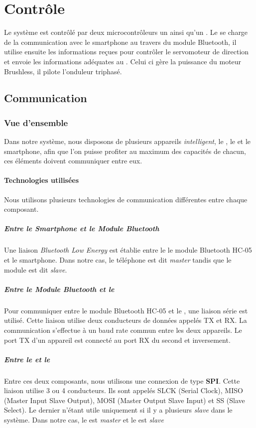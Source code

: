 	\chapter{Contrôle}
	Le système est contrôlé par deux microcontrôleurs un \pic ainsi qu'un \dspic. Le \pic se charge de la communication avec le smartphone au travers du module Bluetooth, il utilise ensuite les informations reçues pour contrôler le servomoteur de direction et envoie les informations adéquates au \dspic. Celui ci gère la puissance du moteur Brushless, il pilote l'onduleur triphasé.%
		\section{Communication}
			\subsection{Vue d'ensemble}
				Dans notre système, nous disposons de plusieurs appareils \textit{intelligent}, le \pic , le \dspic et le smartphone, afin que l'on puisse profiter au maximum des capacités de chacun, ces éléments doivent communiquer entre eux.
				\subsubsection{Technologies utilisées}
				Nous utilisons plusieurs technologies de communication différentes entre chaque composant.
				\paragraph{Entre le \textit{Smartphone} et le \textit{Module Bluetooth}} Une liaison \textit{Bluetooth Low Energy} est établie entre le le module Bluetooth HC-05 et le smartphone. Dans notre cas, le téléphone est dit \textit{master} tandis que le module est dit \textit{slave}.
				\paragraph{Entre le \textit{Module Bluetooth} et le \textit{\pic} } Pour communiquer entre le module Bluetooth HC-05 et le \pic, une liaison série est utilisé. Cette liaison utilise deux conducteurs de données appelés TX et RX. La communication s'effectue à un baud rate commun entre les deux appareils. Le port TX d'un appareil est connecté au port RX du second et inversement.
				\paragraph{Entre le \textit{\dspic} et le \textit{\pic}} Entre ces deux composants, nous utilisons une connexion de type \textbf{SPI}. Cette liaison utilise 3 ou 4 conducteurs. Ils sont appelés SLCK (\textsf{Serial Clock}), MISO (\textsf{Master Input Slave Output}), MOSI (\textsf{Master Output Slave Input})  et SS (\textsf{Slave Select}). Le dernier n'étant utile uniquement si il y a plusieurs \textit{slave} dans le système. Dans notre cas, le \pic est \textit{master} et le \dspic est \textit{slave}
				
